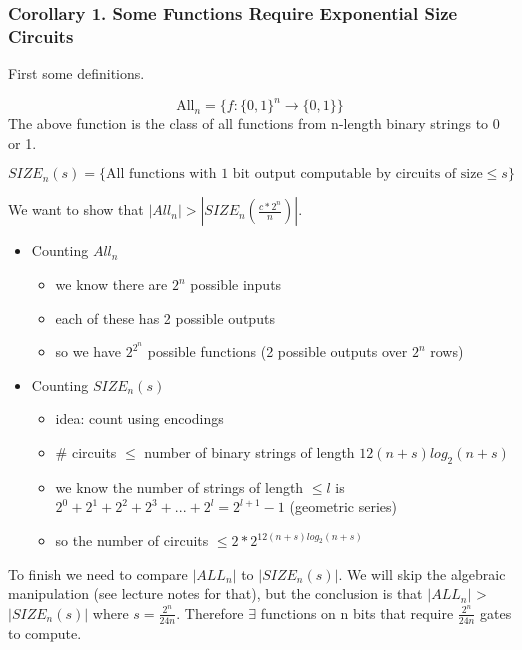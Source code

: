 \hr

\subsubsection*{Corollary 1. Some Functions Require Exponential Size Circuits}

{

First some definitions.

\[
    \text{All}_n = \{ f:\{0,1\}^n \rightarrow \{0, 1\} \}
\]
The above function is the class of all functions from n-length binary strings to 0 or 1.

\[
    SIZE_n(s) = \{ \text{All functions with 1 bit output computable by circuits of size} \le s \}
\]

We want to show that $|All_n| > |SIZE_n(\frac{c*2^n}{n})|$.
\begin{itemize}
    \item Counting $All_n$
    \begin{itemize}
        \item we know there are $2^n$ possible inputs
        \item each of these has 2 possible outputs
        \item so we have $2^{2^n}$ possible functions (2 possible outputs over $2^n$ rows)
    \end{itemize}
    \item Counting $SIZE_n(s)$
    \begin{itemize}
        \item idea: count using encodings
        \item \# circuits $\le$ number of binary strings of length $12(n + s)log_2(n + s)$
        \item we know the number of strings of length $\le l$ is $2^0 + 2^1 + 2^2 + 2^3 + ... + 2^l = 2^{l + 1} - 1$ (geometric series)
        \item so the number of circuits $\le 2 * 2^{12(n+s)log_2(n+s)}$
    \end{itemize}
\end{itemize}

To finish we need to compare $|ALL_n|$ to $|SIZE_n(s)|$. We will skip the algebraic manipulation (see lecture notes for that), but the conclusion is that $|ALL_n|$ > $|SIZE_n(s)|$ where $s = \frac{2^n}{24n}$. Therefore $\exists$ functions on n bits that require $\frac{2^n}{24n}$ gates to compute.
}

